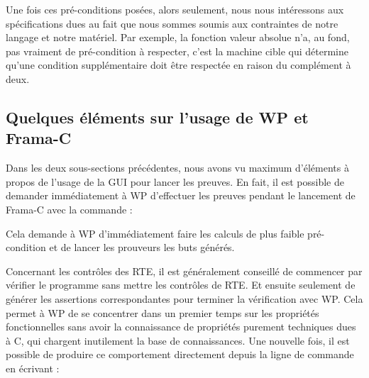 \documentclass[12pt,francais,]{scrbook}
\newenvironment{Shaded}{}{}
\newcommand{\KeywordTok}[1]{\textcolor[rgb]{0.00,0.44,0.13}{\textbf{{#1}}}}
\newcommand{\NormalTok}[1]{{#1}}
\begin{document}
Une fois ces pré-conditions posées, alors seulement, nous nous
intéressons aux spécifications dues au fait que nous sommes soumis aux
contraintes de notre langage et notre matériel. Par exemple, la fonction
valeur absolue n'a, au fond, pas vraiment de pré-condition à respecter,
c'est la machine cible qui détermine qu'une condition supplémentaire
doit être respectée en raison du complément à deux.

\subsection{Quelques éléments sur l'usage de WP et
Frama-C}\label{quelques-uxe9luxe9ments-sur-lusage-de-wp-et-frama-c}

Dans les deux sous-sections précédentes, nous avons vu maximum
d'éléments à propos de l'usage de la GUI pour lancer les preuves. En
fait, il est possible de demander immédiatement à WP d'effectuer les
preuves pendant le lancement de Frama-C avec la commande :

\begin{footnotesize}\begin{Shaded}
\end{Shaded}\end{footnotesize}

Cela demande à WP d'immédiatement faire les calculs de plus faible
pré-condition et de lancer les prouveurs les buts générés.

Concernant les contrôles des RTE, il est généralement conseillé de
commencer par vérifier le programme sans mettre les contrôles de RTE. Et
ensuite seulement de générer les assertions correspondantes pour
terminer la vérification avec WP. Cela permet à WP de se \og{}concentrer\fg{}
dans un premier temps sur les propriétés fonctionnelles sans avoir la
connaissance de propriétés purement techniques dues à C, qui chargent
inutilement la base de connaissances. Une nouvelle fois, il est possible
de produire ce comportement directement depuis la ligne de commande en
écrivant :

\begin{footnotesize}\begin{Shaded}
\end{Shaded}\end{footnotesize}
\end{document}
